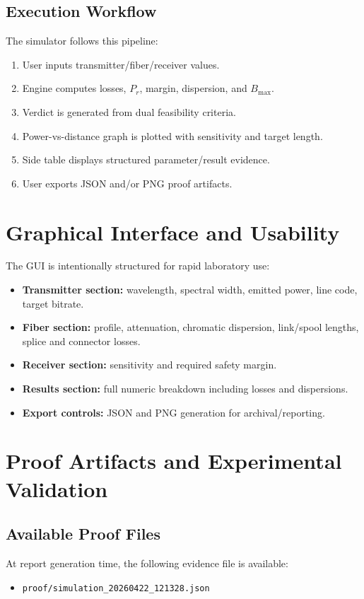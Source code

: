 \documentclass[11pt,a4paper]{article}
\begin{document}
\subsection{Execution Workflow}
The simulator follows this pipeline:
\begin{enumerate}[leftmargin=1.2cm]
  \item User inputs transmitter/fiber/receiver values.
  \item Engine computes losses, $P_r$, margin, dispersion, and $B_{\max}$.
  \item Verdict is generated from dual feasibility criteria.
  \item Power-vs-distance graph is plotted with sensitivity and target length.
  \item Side table displays structured parameter/result evidence.
  \item User exports JSON and/or PNG proof artifacts.
\end{enumerate}

\section{Graphical Interface and Usability}
The GUI is intentionally structured for rapid laboratory use:
\begin{itemize}[leftmargin=1.2cm]
  \item \textbf{Transmitter section:} wavelength, spectral width, emitted power, line code, target bitrate.
  \item \textbf{Fiber section:} profile, attenuation, chromatic dispersion, link/spool lengths, splice and connector losses.
  \item \textbf{Receiver section:} sensitivity and required safety margin.
  \item \textbf{Results section:} full numeric breakdown including losses and dispersions.
  \item \textbf{Export controls:} JSON and PNG generation for archival/reporting.
\end{itemize}

\section{Proof Artifacts and Experimental Validation}
\subsection{Available Proof Files}
At report generation time, the following evidence file is available:
\begin{itemize}[leftmargin=1.2cm]
  \item \texttt{proof/simulation\_20260422\_121328.json}
\end{itemize}
\end{document}
